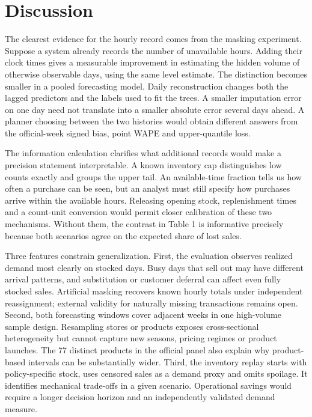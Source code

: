 \documentclass[11pt,a4paper]{article}
\begin{document}
\section{Discussion}

The clearest evidence for the hourly record comes from the masking experiment. Suppose a system already records the number of unavailable hours. Adding their clock times gives a measurable improvement in estimating the hidden volume of otherwise observable days, using the same level estimate. The distinction becomes smaller in a pooled forecasting model. Daily reconstruction changes both the lagged predictors and the labels used to fit the trees. A smaller imputation error on one day need not translate into a smaller absolute error several days ahead. A planner choosing between the two histories would obtain different answers from the official-week signed bias, point WAPE and upper-quantile loss.

The information calculation clarifies what additional records would make a precision statement interpretable. A known inventory cap distinguishes low counts exactly and groups the upper tail. An available-time fraction tells us how often a purchase can be seen, but an analyst must still specify how purchases arrive within the available hours. Releasing opening stock, replenishment times and a count-unit conversion would permit closer calibration of these two mechanisms. Without them, the contrast in Table 1 is informative precisely because both scenarios agree on the expected share of lost sales.

Three features constrain generalization. First, the evaluation observes realized demand most clearly on stocked days. Busy days that sell out may have different arrival patterns, and substitution or customer deferral can affect even fully stocked sales. Artificial masking recovers known hourly totals under independent reassignment; external validity for naturally missing transactions remains open. Second, both forecasting windows cover adjacent weeks in one high-volume sample design. Resampling stores or products exposes cross-sectional heterogeneity but cannot capture new seasons, pricing regimes or product launches. The 77 distinct products in the official panel also explain why product-based intervals can be substantially wider. Third, the inventory replay starts with policy-specific stock, uses censored sales as a demand proxy and omits spoilage. It identifies mechanical trade-offs in a given scenario. Operational savings would require a longer decision horizon and an independently validated demand measure.
\end{document}
